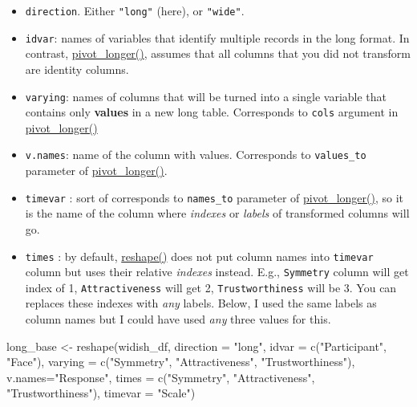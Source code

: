 \documentclass[
]{book}
\newenvironment{Shaded}{\begin{snugshade}}{\end{snugshade}}
\newcommand{\AttributeTok}[1]{\textcolor[rgb]{0.77,0.63,0.00}{#1}}
\newcommand{\FunctionTok}[1]{\textcolor[rgb]{0.00,0.00,0.00}{#1}}
\newcommand{\NormalTok}[1]{#1}
\newcommand{\OtherTok}[1]{\textcolor[rgb]{0.56,0.35,0.01}{#1}}
\newcommand{\StringTok}[1]{\textcolor[rgb]{0.31,0.60,0.02}{#1}}
\providecommand{\tightlist}{%
  \setlength{\itemsep}{0pt}\setlength{\parskip}{0pt}}
\begin{document}
\begin{itemize}
\tightlist
\item
  \texttt{direction}. Either \texttt{"long"} (here), or \texttt{"wide"}.
\item
  \texttt{idvar}: names of variables that identify multiple records in the long format. In contrast, \href{https://tidyr.tidyverse.org/reference/pivot_longer.html}{pivot\_longer()}, assumes that all columns that you did not transform are identity columns.
\item
  \texttt{varying}: names of columns that will be turned into a single variable that contains only \textbf{values} in a new long table. Corresponds to \texttt{cols} argument in \href{https://tidyr.tidyverse.org/reference/pivot_longer.html}{pivot\_longer()}
\item
  \texttt{v.names}: name of the column with values. Corresponds to \texttt{values\_to} parameter of \href{https://tidyr.tidyverse.org/reference/pivot_longer.html}{pivot\_longer()}.
\item
  \texttt{timevar} : sort of corresponds to \texttt{names\_to} parameter of \href{https://tidyr.tidyverse.org/reference/pivot_longer.html}{pivot\_longer()}, so it is the name of the column where \emph{indexes} or \emph{labels} of transformed columns will go.
\item
  \texttt{times} : by default, \href{https://stat.ethz.ch/R-manual/R-patched/library/stats/html/reshape.html}{reshape()} does not put column names into \texttt{timevar} column but uses their relative \emph{indexes} instead. E.g., \texttt{Symmetry} column will get index of 1, \texttt{Attractiveness} will get 2, \texttt{Trustworthiness} will be 3. You can replaces these indexes with \emph{any} labels. Below, I used the same labels as column names but I could have used \emph{any} three values for this.
\end{itemize}

\begin{Shaded}
\begin{Highlighting}[]
\NormalTok{long\_base }\OtherTok{\textless{}{-}} \FunctionTok{reshape}\NormalTok{(widish\_df, }
                     \AttributeTok{direction =} \StringTok{"long"}\NormalTok{,}
                     \AttributeTok{idvar =} \FunctionTok{c}\NormalTok{(}\StringTok{"Participant"}\NormalTok{,  }\StringTok{"Face"}\NormalTok{),}
                     \AttributeTok{varying =} \FunctionTok{c}\NormalTok{(}\StringTok{"Symmetry"}\NormalTok{, }\StringTok{"Attractiveness"}\NormalTok{, }\StringTok{"Trustworthiness"}\NormalTok{),}
                     \AttributeTok{v.names=}\StringTok{"Response"}\NormalTok{,}
                     \AttributeTok{times =} \FunctionTok{c}\NormalTok{(}\StringTok{"Symmetry"}\NormalTok{, }\StringTok{"Attractiveness"}\NormalTok{, }\StringTok{"Trustworthiness"}\NormalTok{),}
                     \AttributeTok{timevar =} \StringTok{"Scale"}\NormalTok{)}
\end{Highlighting}
\end{Shaded}
\end{document}
